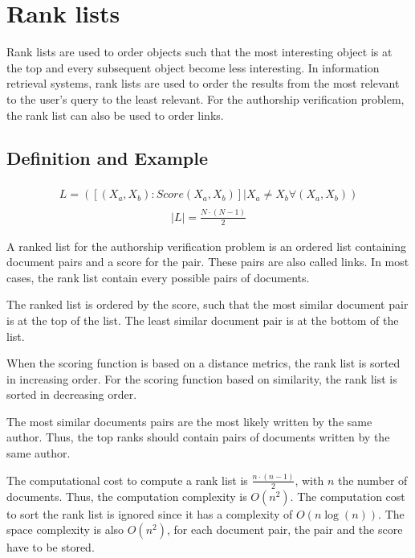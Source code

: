 \section{Rank lists}

Rank lists are used to order objects such that the most interesting object is at the top and every subsequent object become less interesting.
In information retrieval systems, rank lists are used to order the results from the most relevant to the user's query to the least relevant.
For the authorship verification problem, the rank list can also be used to order links.

\subsection{Definition and Example}

\begin{definition}
  \begin{gather*}
      \begin{split}
        L = (\left[(X_a, X_b): Score(X_a, X_b)\right] | X_a \neq X_b \forall (X_a, X_b))
      \end{split}
  \end{gather*}
  \begin{gather*}
    |L| = \frac{N \cdot (N - 1)}{2}
  \end{gather*}
\end{definition}

A ranked list for the authorship verification problem is an ordered list containing document pairs and a score for the pair.
These pairs are also called links.
In most cases, the rank list contain every possible pairs of documents.

The ranked list is ordered by the score, such that the most similar document pair is at the top of the list.
The least similar document pair is at the bottom of the list.

When the scoring function is based on a distance metrics, the rank list is sorted in increasing order.
For the scoring function based on similarity, the rank list is sorted in decreasing order.

The most similar documents pairs are the most likely written by the same author.
Thus, the top ranks should contain pairs of documents written by the same author.

The computational cost to compute a rank list is $\frac{n \cdot (n - 1)}{2}$, with $n$ the number of documents.
Thus, the computation complexity is $O(n^2)$.
The computation cost to sort the rank list is ignored since it has a complexity of $O(n\log(n))$.
The space complexity is also $O(n^2)$, for each document pair, the pair and the score have to be stored.

